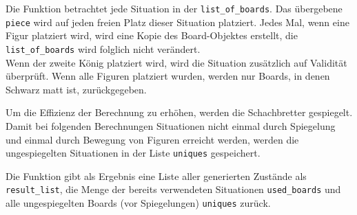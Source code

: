 \documentclass[12pt]{article}
\begin{document}
Die Funktion betrachtet jede Situation in der \texttt{list\_of\_boards}.
Das übergebene \texttt{piece} wird auf jeden freien Platz dieser
Situation platziert. Jedes Mal, wenn eine Figur platziert wird, wird
eine Kopie des Board-Objektes erstellt, die \texttt{list\_of\_boards}
wird folglich nicht verändert.\\
Wenn der zweite König platziert wird, wird die Situation zusätzlich auf
Validität überprüft. Wenn alle Figuren platziert wurden, werden nur
Boards, in denen Schwarz matt ist, zurückgegeben.

Um die Effizienz der Berechnung zu erhöhen, werden die Schachbretter
gespiegelt. Damit bei folgenden Berechnungen Situationen nicht einmal
durch Spiegelung und einmal durch Bewegung von Figuren erreicht werden,
werden die ungespiegelten Situationen in der Liste \texttt{uniques}
gespeichert.

Die Funktion gibt als Ergebnis eine Liste aller generierten Zustände als
\texttt{result\_list}, die Menge der bereits verwendeten Situationen
\texttt{used\_boards} und alle ungespiegelten Boards (vor Spiegelungen)
\texttt{uniques} zurück.
\end{document}
